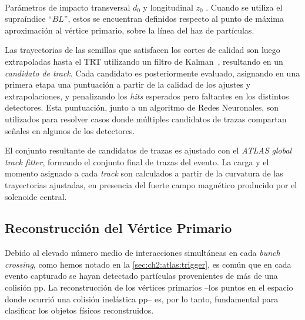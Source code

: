 \begin{marginfigure}
    \centering
    \subfloat[][\label{fig:ch3:tracks_impact-param:d0}]{}\\
    \subfloat[][\label{fig:ch3:tracks_impact-param:z0}]{}

    \caption{Parámetros de impacto transversal $d_0$  y longitudinal $z_0$ . Cuando se utiliza el supraíndice ``$BL$'', estos se encuentran definidos respecto al punto de máxima aproximación al vértice primario, sobre la línea del haz de partículas.}
    \label{fig:ch3:tracks_impact-param}
\end{marginfigure}

Las trayectorias de las semillas que satisfacen los cortes de calidad son luego extrapoladas hasta el TRT utilizando un filtro de Kalman~\cite{Fruhwirth1987}, resultando en un \textit{candidato de track}. Cada candidato es posteriormente evaluado, asignando en una primera etapa una puntuación a partir de la calidad de los ajustes y extrapolaciones, y penalizando los \textit{hits} esperados pero faltantes en los distintos detectores. Esta puntuación, junto a un algoritmo de Redes Neuronales, son utilizados para resolver casos donde múltiples candidatos de trazas compartan señales en algunos de los detectores.

El conjunto resultante de candidatos de trazas es ajustado con el \textit{ATLAS global track fitter}, formando el conjunto final de trazas del evento. La carga y el momento asignado a cada \textit{track} son calculados a partir de la curvatura de las trayectorias ajustadas, en presencia del fuerte campo magnético producido por el solenoide central.


\subsection{Reconstrucción del Vértice Primario}

Debido al elevado número medio de interacciones simultáneas en cada \textit{bunch crossing}, como hemos notado en la \cref{sec:ch2:atlas:trigger}, es común que en cada evento capturado se hayan detectado partículas provenientes de más de una colisión pp. La reconstrucción de los vértices primarios --los puntos en el espacio donde ocurrió una colisión inelástica pp-- es, por lo tanto, fundamental para clasificar los objetos físicos reconstruidos.


